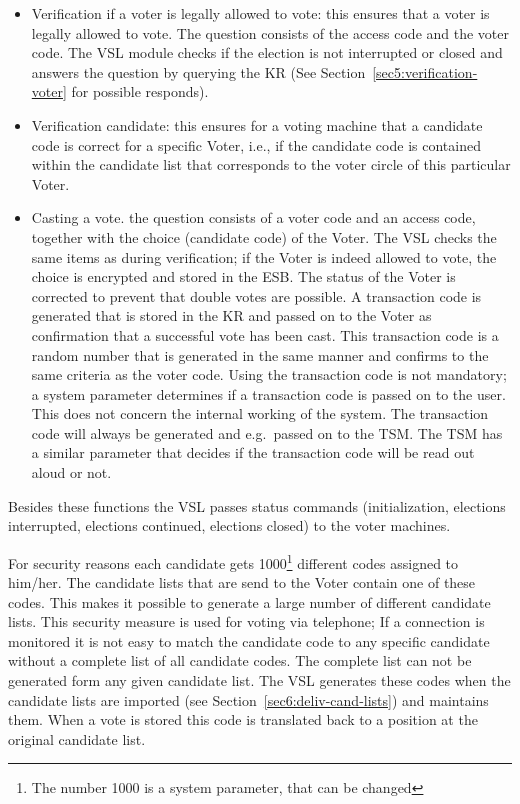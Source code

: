\begin{itemize}
	\item Verification if a voter is legally allowed to vote: this
	ensures that a voter is legally allowed to vote. The question
	consists of the access code and the voter code. The VSL module
	checks if the election is not interrupted or closed and
	answers the question by querying the KR (See
	Section~\ref{sec5:verification-voter} for possible responds).

	\item Verification candidate: this ensures for a voting
	machine that a candidate code is correct for a specific Voter,
	i.e., if the candidate code is contained within the candidate
	list that corresponds to the voter circle of this particular
	Voter.

	\item Casting a vote. the question consists of a voter code
	and an access code, together with the choice (candidate code)
	of the Voter. The VSL checks the same items as during
	verification; if the Voter is indeed allowed to vote, the
	choice is encrypted and stored in the ESB. The status of the
	Voter is corrected to prevent that double votes are
	possible. A transaction code is generated that is stored in
	the KR and passed on to the Voter as confirmation that a
	successful vote has been cast. This transaction code is a
	random number that is generated in the same manner and
	confirms to the same criteria as the voter code. Using the
	transaction code is not mandatory; a system parameter
	determines if a transaction code is passed on to the
	user. This does not concern the internal working of the
	system. The transaction code will always be generated and
	e.g.\ passed on to the TSM. The TSM has a similar parameter
	that decides if the transaction code will be read out aloud or
	not.
	
\end{itemize}

Besides these functions the VSL passes status commands
(initialization, elections interrupted, elections continued, elections
closed) to the voter machines.

For security reasons each candidate gets 1000\footnote{The number 1000
is a system parameter, that can be changed} different codes assigned
to him/her. The candidate lists that are send to the Voter contain one
of these codes. This makes it possible to generate a large number of
different candidate lists. This security measure is used for voting
via telephone; If a connection is monitored it is not easy to match
the candidate code to any specific candidate without a complete list
of all candidate codes. The complete list can not be generated form
any given candidate list. The VSL generates these codes when the
candidate lists are imported (see Section~\ref{sec6:deliv-cand-lists})
and maintains them. When a vote is stored this code is translated back
to a position at the original candidate list.

